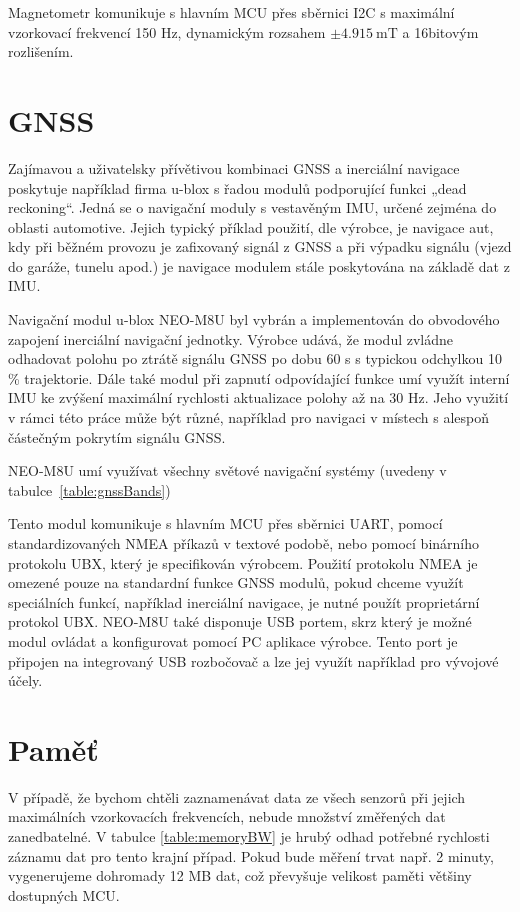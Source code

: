 Magnetometr komunikuje s hlavním \ac{MCU} přes sběrnici \ac{I2C} s maximální vzorkovací frekvencí 150 Hz, dynamickým rozsahem $ \pm \SI{4.915}{\milli\tesla} $ a 16bitovým rozlišením. \cite{RD5DwZcremhT6bgp}

\section{GNSS}
Zajímavou a uživatelsky přívětivou kombinaci \ac{GNSS} a inerciální navigace poskytuje například firma u-blox s řadou modulů podporující funkci „dead reckoning“. Jedná se o navigační moduly s vestavěným \ac{IMU}, určené zejména do oblasti automotive. Jejich typický příklad použití, dle výrobce, je navigace aut, kdy při běžném provozu je zafixovaný signál z \ac{GNSS} a při výpadku signálu (vjezd do garáže, tunelu apod.) je navigace modulem stále poskytována na základě dat z \ac{IMU}. \cite{DLQg9bT6V1GWKhxh}

Navigační modul u-blox NEO-M8U byl vybrán a implementován do obvodového zapojení inerciální navigační jednotky.
Výrobce udává, že modul zvládne odhadovat polohu po ztrátě signálu \ac{GNSS} po dobu 60 s s typickou odchylkou 10 \% trajektorie. Dále také modul při zapnutí odpovídající funkce umí využít interní \ac{IMU} ke zvýšení maximální rychlosti aktualizace polohy až na 30 Hz. Jeho využití v rámci této práce může být různé, například pro navigaci v místech s alespoň částečným pokrytím signálu \ac{GNSS}. \cite{DLQg9bT6V1GWKhxh}

NEO-M8U umí využívat všechny světové navigační systémy (uvedeny v tabulce~\ref{table:gnssBands})

Tento modul komunikuje s hlavním \ac{MCU} přes sběrnici \ac{UART}, pomocí standardizovaných \ac{NMEA} příkazů v textové podobě, nebo pomocí binárního protokolu \ac{UBX}, který je specifikován výrobcem. Použití protokolu \ac{NMEA} je omezené pouze na standardní funkce \ac{GNSS} modulů, pokud chceme využít speciálních funkcí, například inerciální navigace, je nutné použít proprietární protokol \ac{UBX}. \cite{DLQg9bT6V1GWKhxh} NEO-M8U také disponuje \ac{USB} portem, skrz který je možné modul ovládat a konfigurovat pomocí PC aplikace výrobce. Tento port je připojen na integrovaný \ac{USB} rozbočovač a lze jej využít například pro vývojové účely.

\section{Paměť}

V případě, že bychom chtěli zaznamenávat data ze všech senzorů při jejich maximálních vzorkovacích frekvencích, nebude množství změřených dat zanedbatelné. V tabulce \ref{table:memoryBW} je hrubý odhad potřebné rychlosti záznamu dat pro tento krajní případ. Pokud bude měření trvat např. 2 minuty, vygenerujeme dohromady 12 MB dat, což převyšuje velikost paměti většiny dostupných \ac{MCU}.

